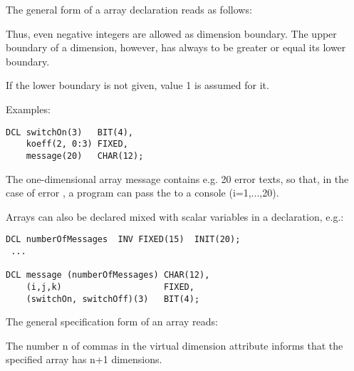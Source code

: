 The general form of a array declaration reads as follows:

\begin{grammarframe}
\end{grammarframe}

Thus, even negative integers are allowed as dimension boundary. The
upper boundary of a dimension, however, has always to be greater or
equal its lower boundary.

If the lower boundary is not given, value 1 is assumed for it.


Examples:

\begin{lstlisting}
DCL switchOn(3)   BIT(4),
    koeff(2, 0:3) FIXED,
    message(20)   CHAR(12);
\end{lstlisting}

The one-dimensional array message contains e.g. 20 error texts, so that,
in the case of error , a program can pass the 
 to a console
(i=1,...,20).

Arrays can also be declared mixed with scalar variables in a declaration,
e.g.:

\begin{lstlisting}
DCL numberOfMessages  INV FIXED(15)  INIT(20);
 ...

DCL message (numberOfMessages) CHAR(12),
    (i,j,k)                    FIXED,
    (switchOn, switchOff)(3)   BIT(4);
\end{lstlisting}

The general specification form of an array reads:

\begin{grammarframe}
\end{grammarframe}

The number n of commas in the virtual dimension attribute informs that
the specified array has n+1 dimensions.

